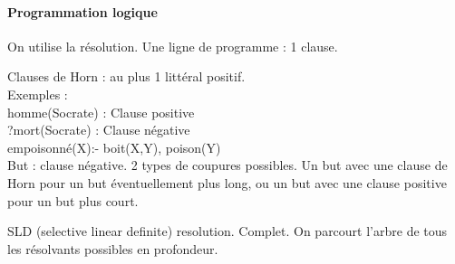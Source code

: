 \documentclass[french]{article}
\begin{document}
\paragraph{Programmation logique}
On utilise la résolution. Une ligne de programme : 1 clause.

Clauses de Horn : au plus 1 littéral positif.\\
Exemples : \\
homme(Socrate) : Clause positive\\
?mort(Socrate) : Clause négative\\
empoisonné(X):- boit(X,Y), poison(Y)\\

But : clause négative. 2 types de coupures possibles. Un but avec une clause de Horn pour un but éventuellement plus long, ou un but avec une clause positive pour un but plus court.

SLD (selective linear definite) resolution. Complet. On parcourt l'arbre de tous les résolvants possibles en profondeur.
\end{document}
